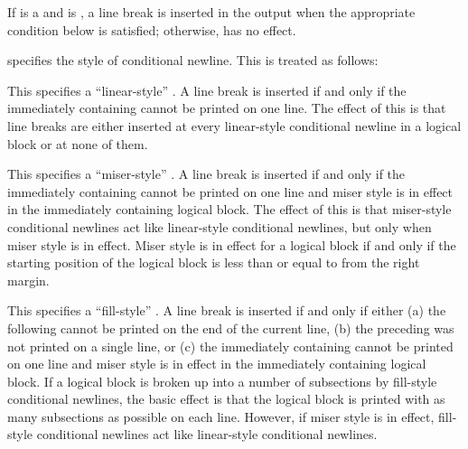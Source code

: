 If  is a 
   and  is ,
a line break is inserted in the output 
when the appropriate condition below is satisfied;
otherwise,  has no effect.

 specifies the style of conditional newline.
This  is treated as follows:

\beginlist

\item{}

This specifies a
``linear-style'' .
A line break is inserted 
if and only if the immediately containing 
cannot be printed on one line.
The effect of this is that line breaks are
either inserted at every linear-style conditional newline in a logical block
or at none of them.

\item{}

This specifies a 
``miser-style'' .
A line break is inserted
if and only if the immediately containing 
cannot be printed on one line
and miser style is in effect in the immediately containing logical block.
The effect of this is that miser-style conditional newlines
act like linear-style conditional newlines,
but only when miser style is in effect.
Miser style is in effect for a logical block if and only if 
the starting position of the logical block
is less than or equal to
  from the right margin.

\item{}

This specifies a
``fill-style'' .
A line break is inserted if and only if
either (a) the following  cannot be printed 
	   on the end of the current line,
       (b) the preceding  was not printed on a single line,
    or (c) the immediately containing  cannot
	   be printed on one line and miser style is in effect
	   in the immediately containing logical block.
If a logical block is broken up into a number of subsections
by fill-style conditional newlines,
the basic effect is that the logical block
is printed with as many subsections as possible on each line.
However, if miser style is in effect,
fill-style conditional newlines act like linear-style conditional newlines.

